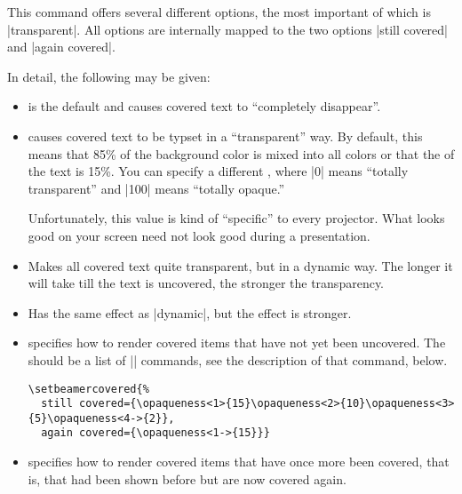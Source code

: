 \begin{command}{\setbeamercovered{}}
  This command offers several different options, the most important of which is |transparent|. All options are internally mapped to the two options |still covered| and |again covered|.

  In detail, the following  may be given:
  \begin{itemize}
  \item
     is the default and causes covered text to ``completely disappear''.
  \item
     causes covered text to be typset in a ``transparent'' way. By default, this means that 85\% of the background color is mixed into all colors or that the  of the text is 15\%. You can specify a different , where |0| means ``totally transparent'' and |100| means ``totally opaque.''

    Unfortunately, this value is kind of ``specific'' to every projector. What looks good on your screen need not look good during a presentation.
  \item
     Makes all covered text quite transparent, but in a dynamic way. The longer it will take till the text is uncovered, the stronger the transparency.
  \item
     Has the same effect as |dynamic|, but the effect is stronger.
  \item
     specifies how to render covered items that have not yet been uncovered. The  should be a list of |\opaqueness| commands, see the description of that command, below.
    \example
\begin{verbatim}
\setbeamercovered{%
  still covered={\opaqueness<1>{15}\opaqueness<2>{10}\opaqueness<3>{5}\opaqueness<4->{2}},
  again covered={\opaqueness<1->{15}}}
\end{verbatim}

  \item
     specifies how to render covered items that have once more been covered, that is, that had been shown before but are now covered again.
  \end{itemize}
\end{command}

